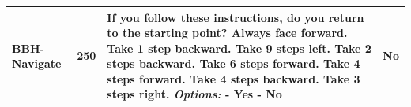 \begin{table}[ht]
{\begin{tabular}{l | c |p{6cm} |p{4cm}}
BBH-Navigate & 250 & 
If you follow these instructions, do you return to the starting point? Always face forward. Take 1 step backward. Take 9 steps left. Take 2 steps backward. Take 6 steps forward. Take 4 steps forward. Take 4 steps backward. Take 3 steps right.
\newline \textit{Options:}
- Yes
- No
&  No\\



\bottomrule
\end{tabular}}
\end{table}


